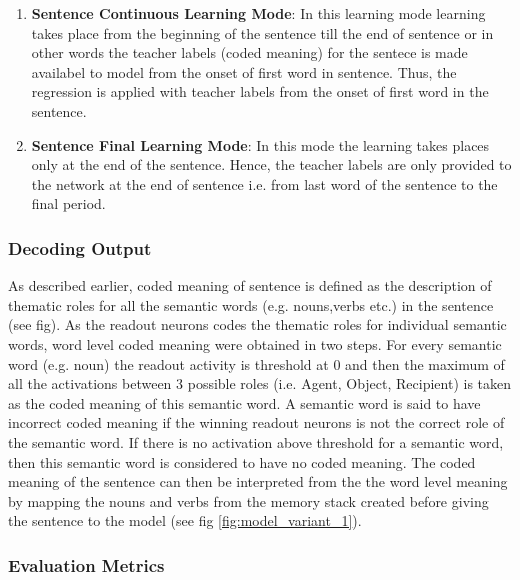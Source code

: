\begin{enumerate}
\setlength{\itemsep}{\smallskipamount}

\item \textbf{Sentence Continuous Learning Mode}: In this learning mode learning takes place from the beginning of the sentence till the end of sentence or in other words the teacher labels (coded meaning) for the sentece is made availabel to model from the onset of first word in sentence. Thus, the regression is applied with teacher labels from the onset of first word in the sentence. \label{eg:SCL}

\item \textbf{Sentence Final Learning Mode}: In this mode the learning takes places only at the end of the sentence. Hence, the teacher labels are only provided to the network at the end of sentence i.e. from last word of the sentence to the final period. \label{eg:SFL}

\end{enumerate} 

\subsubsection{Decoding Output}

As described earlier, coded meaning of sentence is defined as the description of thematic roles for all the semantic words (e.g. nouns,verbs etc.) in the sentence (see fig). As the readout neurons codes the thematic roles for individual semantic words, word level coded meaning were obtained in two steps. For every semantic word (e.g. noun) the readout activity is threshold at 0 and then the maximum of all the activations between 3 possible roles (i.e. Agent, Object, Recipient) is taken as the coded meaning of this semantic word. A semantic word is said to have incorrect coded meaning if the winning readout neurons is not the correct role of the semantic word. If there is no activation above threshold for a semantic word, then this semantic word is considered to have no coded meaning. The coded meaning of the sentence can then be interpreted from the the word level meaning by mapping the nouns and verbs from the memory stack created before giving the sentence to the model (see fig \ref{fig:model_variant_1}).

\subsubsection{Evaluation Metrics}

